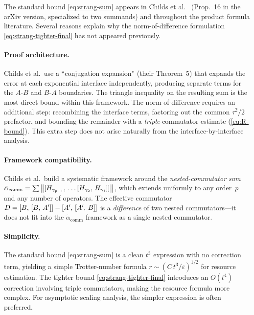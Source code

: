 The standard bound \eqref{eq:strang-sum} appears in
Childs et al.~\cite{childsTheoryTrotterError2021} (Prop.~16 in the arXiv
version, specialized to two summands) and
throughout the product formula literature. Several reasons explain why
the norm-of-difference formulation \eqref{eq:strang-tighter-final} has
not appeared previously.

\paragraph{Proof architecture.}
Childs et al.\ use a ``conjugation expansion'' (their Theorem~5) that
expands the error at each exponential interface independently, producing
separate terms for the $A$-$B$ and $B$-$A$ boundaries. The triangle
inequality on the resulting sum is the most direct bound within this
framework. The norm-of-difference requires an additional step:
recombining the interface terms, factoring out the common $\tau^2/2$
prefactor, and bounding the remainder with a \emph{triple}-commutator
estimate (\cref{eq:R-bound}). This extra step does not arise naturally
from the interface-by-interface analysis.

\paragraph{Framework compatibility.}
Childs et al.\ build a systematic framework around the
\emph{nested-commutator sum}
$\tilde\alpha_{\mathrm{comm}} =
  \sum \left\|[H_{\gamma_{p+1}},\,\ldots[H_{\gamma_2},\,H_{\gamma_1}]]\right\|$,
which extends uniformly to any order~$p$ and any number of operators.
The effective commutator $D = [B,\,[B,\,A']] - [A',\,[A',\,B]]$
is a \emph{difference} of two nested commutators---it does not fit into
the $\tilde\alpha_{\mathrm{comm}}$ framework as a single nested commutator.

\paragraph{Simplicity.}
The standard bound \eqref{eq:strang-sum} is a clean $t^3$ expression
with no correction term, yielding a simple Trotter-number formula
$r \sim (C\,t^3/\varepsilon)^{1/2}$ for resource estimation.
The tighter bound \eqref{eq:strang-tighter-final} introduces an $O(t^4)$
correction involving triple commutators, making the resource formula
more complex. For asymptotic scaling analysis, the simpler expression
is often preferred.

